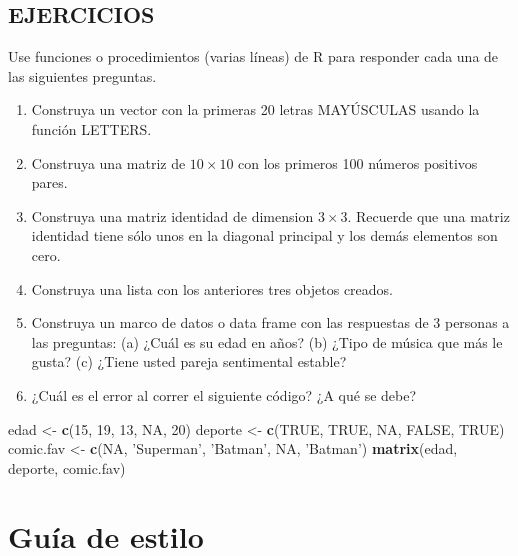 \documentclass[10pt,]{krantz}
\makeatletter
\newenvironment{Shaded}{\begin{snugshade}}{\end{snugshade}}
\newcommand{\KeywordTok}[1]{\textcolor[rgb]{0.13,0.29,0.53}{\textbf{#1}}}
\newcommand{\DecValTok}[1]{\textcolor[rgb]{0.00,0.00,0.81}{#1}}
\newcommand{\StringTok}[1]{\textcolor[rgb]{0.31,0.60,0.02}{#1}}
\newcommand{\OtherTok}[1]{\textcolor[rgb]{0.56,0.35,0.01}{#1}}
\newcommand{\NormalTok}[1]{#1}
\newenvironment{kframe}{%
\medskip{}
\setlength{\fboxsep}{.8em}
 \def\at@end@of@kframe{}%
 \ifinner\ifhmode%
  \def\at@end@of@kframe{\end{minipage}}%
  \begin{minipage}{\columnwidth}%
 \fi\fi%
 \def\FrameCommand##1{\hskip\@totalleftmargin \hskip-\fboxsep
 \colorbox{shadecolor}{##1}\hskip-\fboxsep
     \hskip-\linewidth \hskip-\@totalleftmargin \hskip\columnwidth}%
 \MakeFramed {\advance\hsize-\width
   \@totalleftmargin\z@ \linewidth\hsize
   \@setminipage}}%
 {\par\unskip\endMakeFramed%
 \at@end@of@kframe}
\renewenvironment{Shaded}{\begin{kframe}}{\end{kframe}}
\makeatother
\begin{document}
\subsection*{EJERCICIOS}\label{ejercicios}

Use funciones o procedimientos (varias líneas) de R para responder cada
una de las siguientes preguntas.

\begin{enumerate}
\def\labelenumi{\arabic{enumi}.}
\item
  Construya un vector con la primeras 20 letras MAYÚSCULAS usando la
  función LETTERS.
\item
  Construya una matriz de \(10 \times 10\) con los primeros 100 números
  positivos pares.
\item
  Construya una matriz identidad de dimension \(3 \times 3\). Recuerde
  que una matriz identidad tiene sólo unos en la diagonal principal y
  los demás elementos son cero.
\item
  Construya una lista con los anteriores tres objetos creados.
\item
  Construya un marco de datos o data frame con las respuestas de 3
  personas a las preguntas: (a) ¿Cuál es su edad en años? (b) ¿Tipo de
  música que más le gusta? (c) ¿Tiene usted pareja sentimental estable?
\item
  ¿Cuál es el error al correr el siguiente código? ¿A qué se debe?
\end{enumerate}

\begin{Shaded}
\begin{Highlighting}[]
\NormalTok{edad <-}\StringTok{ }\KeywordTok{c}\NormalTok{(}\DecValTok{15}\NormalTok{, }\DecValTok{19}\NormalTok{, }\DecValTok{13}\NormalTok{, }\OtherTok{NA}\NormalTok{, }\DecValTok{20}\NormalTok{)}
\NormalTok{deporte <-}\StringTok{ }\KeywordTok{c}\NormalTok{(}\OtherTok{TRUE}\NormalTok{, }\OtherTok{TRUE}\NormalTok{, }\OtherTok{NA}\NormalTok{, }\OtherTok{FALSE}\NormalTok{, }\OtherTok{TRUE}\NormalTok{)}
\NormalTok{comic.fav <-}\StringTok{ }\KeywordTok{c}\NormalTok{(}\OtherTok{NA}\NormalTok{, }\StringTok{'Superman'}\NormalTok{, }\StringTok{'Batman'}\NormalTok{, }\OtherTok{NA}\NormalTok{, }\StringTok{'Batman'}\NormalTok{)}
\KeywordTok{matrix}\NormalTok{(edad, deporte, comic.fav)}
\end{Highlighting}
\end{Shaded}

\section{Guía de estilo}\label{estilo}
\end{document}
